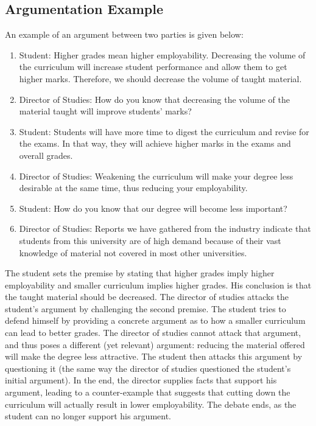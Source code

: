 \documentclass[11pt,twoside,a4paper]{report}
\begin{document}
\subsection{Argumentation Example}
An example of an argument between two parties is given below:

\begin{enumerate}
\item
Student: Higher grades mean higher employability. Decreasing the volume of the curriculum will increase student performance and allow them to get higher marks. Therefore, we should decrease the volume of taught material.
\item
Director of Studies: How do you know that decreasing the volume of the material taught will improve students' marks?
\item
Student: Students will have more time to digest the curriculum and revise for the exams. In that way, they will achieve higher marks in the exams and overall grades.
\item
Director of Studies: Weakening the curriculum will make your degree less desirable at the same time, thus reducing your employability.
\item
Student: How do you know that our degree will become less important?
\item
Director of Studies: Reports we have gathered from the industry indicate that students from this university are of high demand because of their vast knowledge of material not covered in most other universities.
\end{enumerate}

The student sets the premise by stating that higher grades imply higher employability and smaller curriculum implies higher grades. His conclusion is that the taught material should be decreased. The director of studies attacks the student's argument by challenging the second premise. The student tries to defend himself by providing a concrete argument as to how a smaller curriculum can lead to better grades. The director of studies cannot attack that argument, and thus poses a different (yet relevant) argument: reducing the material offered will make the degree less attractive.  The student then attacks this argument by questioning it (the same way the director of studies questioned the student's initial argument). In the end, the director supplies facts that support his argument, leading to a counter-example that suggests that cutting down the curriculum will actually result in lower employability. The debate ends, as the student can no longer support his argument.
\end{document}
